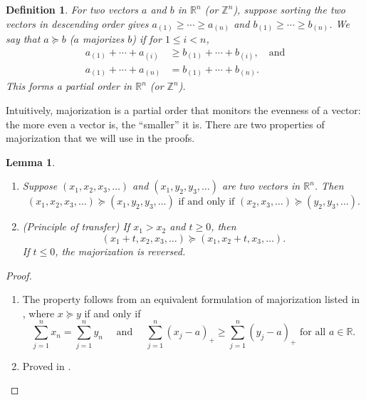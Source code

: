 \documentclass[11pt]{article}
\newtheorem{definition}{Definition}
\newtheorem{lemma}[corollary]{Lemma}
\theoremstyle{definition}
\theoremstyle{custom}
\newcommand{\RR}{\mathbb{R}}
\newcommand{\ZZ}{\mathbb{Z}}
\begin{document}
\begin{definition}
For two vectors $a$ and $b$ in $\RR^n$ (or $\ZZ^n$), suppose sorting the two vectors in descending order gives
$a_{\left(1\right)} \ge \cdots \ge a_{\left(n\right)}$ and $b_{\left(1\right)} \ge \cdots \ge b_{\left(n\right)}$. We say that $a \succeq b$ ($a$ majorizes $b$) if for $1 \le i < n$,
\begin{align*}
a_{\left(1\right)} + \cdots + a_{\left(i\right)} & \ge b_{\left(1\right)} + \cdots + b_{\left(i\right)}, \quad \text{and}\\
a_{\left(1\right)} + \cdots + a_{\left(n\right)} & = b_{\left(1\right)} + \cdots + b_{\left(n\right)}.
\end{align*}
This forms a partial order in $\RR^n$ (or $\ZZ^n$).
\end{definition}

Intuitively, majorization is a partial order that monitors the evenness of a vector: the more even a vector is, the ``smaller'' it is. There are two properties of majorization that we will use in the proofs.

\begin{lemma}\leavevmode
\begin{enumerate}
\item Suppose $\left(x_1, x_2, x_3, \ldots\right)$ and $\left(x_1, y_2, y_3, \ldots\right)$ are two vectors in $\RR^n$. Then
\[\left(x_1, x_2, x_3, \ldots\right) \succeq \left(x_1, y_2, y_3, \ldots\right) \text{ if and only if } \left(x_2, x_3, \ldots\right) \succeq \left(y_2, y_3, \ldots\right).\]
\item (Principle of transfer) If $x_1 > x_2$ and $t \ge 0$, then
\[\left(x_1 + t, x_2, x_3, \ldots\right) \succeq \left(x_1, x_2 + t, x_3, \ldots\right).\]
If $t \le 0$, the majorization is reversed.
\end{enumerate}
\label{lma:twoprop}
\end{lemma}

\begin{proof}\leavevmode
\begin{enumerate}
\item The property follows from an equivalent formulation of majorization listed in \citet{Marshall:2010hb}, where $x \succeq y$ if and only if
\[\sum_{j=1}^n x_n = \sum_{j=1}^n y_n \quad \text{ and } \quad \sum_{j=1}^n \left(x_j - a\right)_+ \ge \sum_{j=1}^n \left(y_j - a\right)_+ \text{ for all } a \in \RR.\]

\item Proved in \citet{Marshall:2010hb}. \qedhere
\end{enumerate}
\end{proof}
\end{document}
